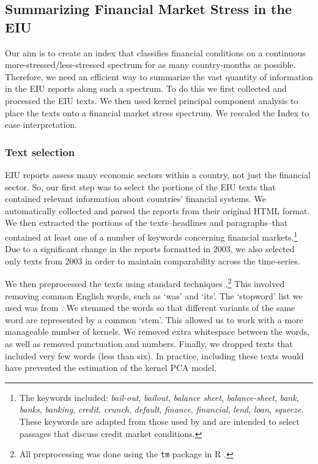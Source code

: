 \documentclass[]{article}
\begin{document}
\subsection{Summarizing Financial Market Stress in the
EIU}\label{summarizing-financial-market-stress-in-the-eiu}

Our aim is to create an index that classifies financial conditions on a continuous more-stressed/less-stressed spectrum for as many country-months as possible. Therefore, we need an efficient way to summarize the vast quantity of information in the EIU reports along such a spectrum. To do this we first collected and processed the EIU texts. We then used kernel principal component analysis to place the texts onto a
financial market stress spectrum. We rescaled the Index to ease interpretation.

\subsubsection{Text selection}\label{text-selection}

EIU reports assess many economic sectors within a country,
not just the financial sector. So, our first step was to select the portions of the EIU texts that contained relevant information about countries' financial systems. We automatically collected and parsed the reports from their original HTML format. We then extracted the portions of the texts--headlines and paragraphs--that contained at least one of a number of keywords concerning financial markets.\footnote{The
  keywords included: \emph{bail-out}, \emph{bailout}, \emph{balance
  sheet}, \emph{balance-sheet}, \emph{bank}, \emph{banks},
  \emph{banking}, \emph{credit}, \emph{crunch}, \emph{default},
  \emph{finance}, \emph{financial}, \emph{lend}, \emph{loan},
  \emph{squeeze}. These keywords are adapted
  from those used by \cite{Romer2015} and are intended to
  select passages that discuss credit market conditions.} Due to a significant change in the reports formatted in 2003, we also
selected only texts from 2003 in order to maintain comparability across the time-series.

We then preprocessed the texts using standard techniques \citep[see][]{Grimmer2013}.\footnote{All preprocessing was done using the \texttt{tm} package \citep{tm2015} in R \citep{R-cite}.} This involved removing common English words, such as `was' and `its'. The `stopword' list we used was from \cite{dhillon:modha:mlj01}. We stemmed the words so that different variants of the same word are represented by a common `stem'. This allowed us to work with a more manageable number of kernels.  We removed extra whitespace between the words, as well as removed punctuation and numbers. Finally, we dropped texts that included very few words (less than six). In practice, including these texts would have prevented the estimation of the kernel PCA model.
\end{document}
